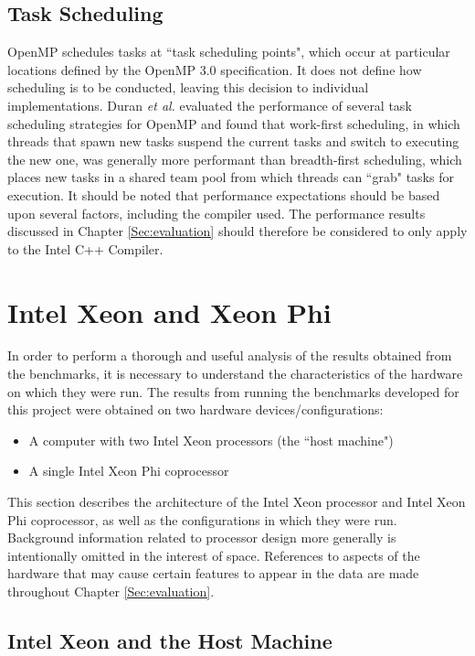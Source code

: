 \documentclass{report}
\begin{document}
\subsection{Task Scheduling}

OpenMP schedules tasks at ``task scheduling points", which occur at particular locations defined by the OpenMP 3.0 specification\cite{openmpspec}. It does not define how scheduling is to be conducted, leaving this decision to individual implementations. Duran \textit{et al.}\cite{Duran09} evaluated the performance of several task scheduling strategies for OpenMP and found that work-first scheduling, in which threads that spawn new tasks suspend the current tasks and switch to executing the new one, was generally more performant than breadth-first scheduling, which places new tasks in a shared team pool from which threads can ``grab" tasks for execution. It should be noted that performance expectations should be based upon several factors, including the compiler used. The performance results discussed in Chapter \ref{Sec:evaluation} should therefore be considered to only apply to the Intel C++ Compiler.

\section{Intel Xeon and Xeon Phi} \label{Sec:intelxeonandxeonphi}

In order to perform a thorough and useful analysis of the results obtained from the benchmarks, it is necessary to understand the characteristics of the hardware on which they were run. The results from running the benchmarks developed for this project were obtained on two hardware devices/configurations:
\begin{itemize}
	\item A computer with two Intel Xeon processors (the ``host machine")
	\item A single Intel Xeon Phi coprocessor
\end{itemize}

This section describes the architecture of the Intel Xeon processor and Intel Xeon Phi coprocessor, as well as the configurations in which they were run. Background information related to processor design more generally is intentionally omitted in the interest of space. References to aspects of the hardware that may cause certain features to appear in the data are made throughout Chapter \ref{Sec:evaluation}.

\subsection{Intel Xeon and the Host Machine} \label{Sec:intelxeonandhost}
\end{document}
